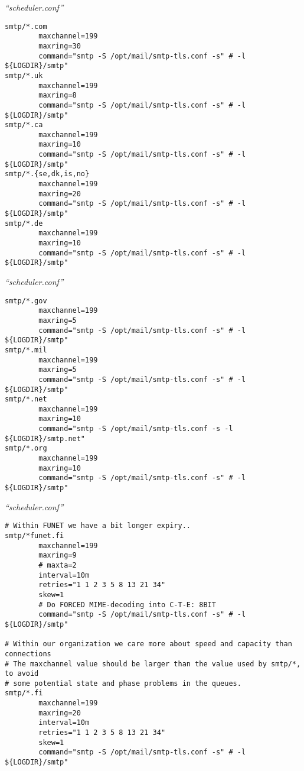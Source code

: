 \documentclass[a4paper,landscape]{slides}
\begin{document}
\begin{overlay}
\small
\centerline{{\it ``scheduler.conf''}}
\tiny
\begin{verbatim}
smtp/*.com
        maxchannel=199
        maxring=30
        command="smtp -S /opt/mail/smtp-tls.conf -s" # -l ${LOGDIR}/smtp"
smtp/*.uk
        maxchannel=199
        maxring=8
        command="smtp -S /opt/mail/smtp-tls.conf -s" # -l ${LOGDIR}/smtp"
smtp/*.ca
        maxchannel=199
        maxring=10
        command="smtp -S /opt/mail/smtp-tls.conf -s" # -l ${LOGDIR}/smtp"
smtp/*.{se,dk,is,no}
        maxchannel=199
        maxring=20
        command="smtp -S /opt/mail/smtp-tls.conf -s" # -l ${LOGDIR}/smtp"
smtp/*.de
        maxchannel=199
        maxring=10
        command="smtp -S /opt/mail/smtp-tls.conf -s" # -l ${LOGDIR}/smtp"
\end{verbatim}
\vfill
\end{overlay}
\begin{overlay}
\small
\centerline{{\it ``scheduler.conf''}}
\tiny
\begin{verbatim}
smtp/*.gov
        maxchannel=199
        maxring=5
        command="smtp -S /opt/mail/smtp-tls.conf -s" # -l ${LOGDIR}/smtp"
smtp/*.mil
        maxchannel=199
        maxring=5
        command="smtp -S /opt/mail/smtp-tls.conf -s" # -l ${LOGDIR}/smtp"
smtp/*.net
        maxchannel=199
        maxring=10
        command="smtp -S /opt/mail/smtp-tls.conf -s -l ${LOGDIR}/smtp.net"
smtp/*.org
        maxchannel=199
        maxring=10
        command="smtp -S /opt/mail/smtp-tls.conf -s" # -l ${LOGDIR}/smtp"
\end{verbatim}
\vfill
\end{overlay}
\begin{overlay}
\small
\centerline{{\it ``scheduler.conf''}}
\tiny
\begin{verbatim}
# Within FUNET we have a bit longer expiry..
smtp/*funet.fi
        maxchannel=199
        maxring=9
        # maxta=2
        interval=10m
        retries="1 1 2 3 5 8 13 21 34"
        skew=1
        # Do FORCED MIME-decoding into C-T-E: 8BIT
        command="smtp -S /opt/mail/smtp-tls.conf -s" # -l ${LOGDIR}/smtp"

# Within our organization we care more about speed and capacity than connections
# The maxchannel value should be larger than the value used by smtp/*, to avoid
# some potential state and phase problems in the queues.
smtp/*.fi
        maxchannel=199
        maxring=20
        interval=10m
        retries="1 1 2 3 5 8 13 21 34"
        skew=1
        command="smtp -S /opt/mail/smtp-tls.conf -s" # -l ${LOGDIR}/smtp"
\end{verbatim}
\vfill
\end{overlay}
\end{document}
